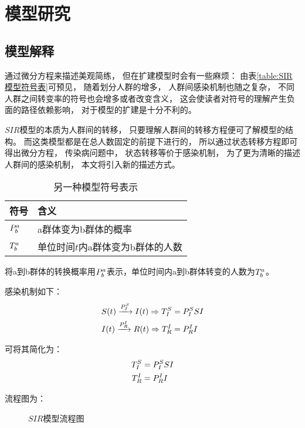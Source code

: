 \section{模型研究}
\subsection{模型解释}
\par 通过微分方程来描述美观简练，
但在扩建模型时会有一些麻烦：
由表\ref{table:SIR模型符号表}可预见，
随着划分人群的增多，
人群间感染机制也随之复杂，
不同人群之间转变率的符号也会增多或者改变含义，
这会使读者对符号的理解产生负面的路径依赖影响，
对于模型的扩建是十分不利的。
\par $SIR$模型的本质为人群间的转移，
只要理解人群间的转移方程便可了解模型的结构。
而这类模型都是在总人数固定的前提下进行的，
所以通过状态转移方程即可得出微分方程，
传染病问题中，
状态转移等价于感染机制，
为了更为清晰的描述人群间的感染机制，
本文将引入新的描述方式。
\begin{table}[H]
    \centering
    \caption{另一种模型符号表示}
    \begin{tabular}{ll}
        \hline
        符号       & 含义                              \\
        \hline
        $\P{a}{b}$ & a群体变为b群体的概率              \\
        $\T{a}{b}$ & 单位时间$t$内a群体变为b群体的人数 \\
        \hline
    \end{tabular}
\end{table}
\par 将a到b群体的转换概率用$\P{a}{b}$表示，单位时间内a到b群体转变的人数为$\T{a}{b}$。
\par 感染机制如下：
\begin{align}
    S(t)\xrightarrow{\P{S}{I}}I(t) \Rightarrow \TP{S}{I}{SI} \\
    I(t)\xrightarrow{\P{I}{R}}R(t) \Rightarrow \TP{I}{R}{I}
\end{align}
\par 可将其简化为：
\begin{align}
    \TP{S}{I}{SI} \\
    \TP{I}{R}{I}
\end{align}
\par 流程图为：
\begin{figure}[H]
    \centering
    \caption{$SIR$模型流程图}
\end{figure}
